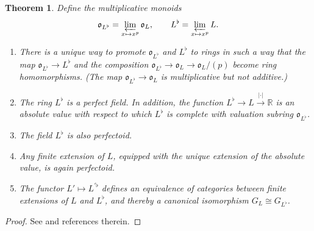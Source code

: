 \documentclass[12pt]{amsart}
\newtheorem{theorem}{Theorem}[section]
\theoremstyle{definition}
\numberwithin{equation}{theorem}
\newcommand{\RR}{\mathbb{R}}
\newcommand{\frako}{\mathfrak{o}}
\begin{document}
\begin{theorem} \label{T:perfectoid}
Define the multiplicative monoids
\[
\frako_{L^{\flat}} = \varprojlim_{x \mapsto x^p} \frako_L, \qquad
L^{\flat} = \varprojlim_{x \mapsto x^p} L.
\]
\begin{enumerate}
\item[(a)]
There is a unique way to promote $\frako_{L^{\flat}}$ and $L^{\flat}$ to rings
in such a way that the map $\frako_{L^{\flat}} \to L^{\flat}$ and the composition $\frako_{L^{\flat}} \to \frako_L \to \frako_L/(p)$ become ring homomorphisms.
(The map $\frako_{L^{\flat}} \to \frako_L$ is multiplicative but not additive.)
\item[(b)]
The ring $L^{\flat}$ is a perfect field. In addition,
the function $L^{\flat} \to L \stackrel{\left| \cdot \right|}{\to} \RR$ is an absolute value with respect to which $L^{\flat}$ is complete with valuation subring $\frako_{L^{\flat}}$.

\item[(c)]
The field $L^\flat$ is also perfectoid.
\item[(d)]
Any finite extension of $L$, equipped with the unique extension of the absolute value, is again perfectoid.
\item[(e)]
The functor $L' \mapsto L^{\prime \flat}$ defines an equivalence of categories between finite extensions of $L$ and $L^{\flat}$, and thereby a canonical isomorphism $G_L \cong G_{L^{\flat}}$.
\end{enumerate}
\end{theorem}
\begin{proof}
See \cite[\S 1]{kedlaya-new-phigamma} and references therein.
\end{proof}
\end{document}
